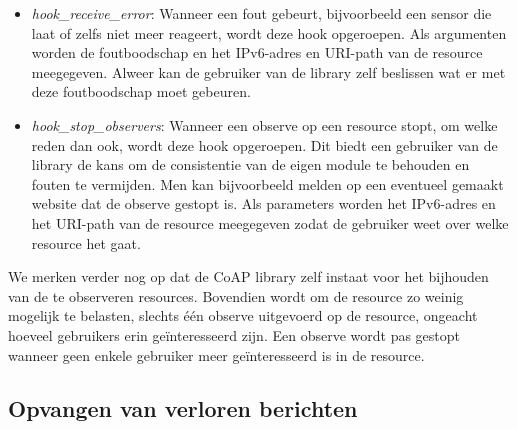 \begin{itemize}
\begin{itemize}
\item \textit{hook\_receive\_error}: Wanneer een fout gebeurt, bijvoorbeeld een sensor die laat of zelfs niet meer reageert, wordt deze hook opgeroepen. Als argumenten worden de foutboodschap en het IPv6-adres en URI-path van de resource meegegeven. Alweer kan de gebruiker van de library zelf beslissen wat er met deze foutboodschap moet gebeuren.
\item \textit{hook\_stop\_observers}: Wanneer een observe op een resource stopt, om welke reden dan ook, wordt deze hook opgeroepen. Dit biedt een gebruiker van de library de kans om de consistentie van de eigen module te behouden en fouten te vermijden. Men kan bijvoorbeeld melden op een eventueel gemaakt website dat de observe gestopt is. Als parameters worden het IPv6-adres en het URI-path van de resource meegegeven zodat de gebruiker weet over welke resource het gaat.
\end{itemize}
\end{itemize}

We merken verder nog op dat de CoAP library zelf instaat voor het bijhouden van de te observeren resources. Bovendien wordt om de resource zo weinig mogelijk te belasten, slechts \'{e}\'{e}n observe uitgevoerd op de resource, ongeacht hoeveel gebruikers erin ge\"{i}nteresseerd zijn. Een observe wordt pas gestopt wanneer geen enkele gebruiker meer ge\"{i}nteresseerd is in de resource.


\subsection{Opvangen van verloren berichten}

